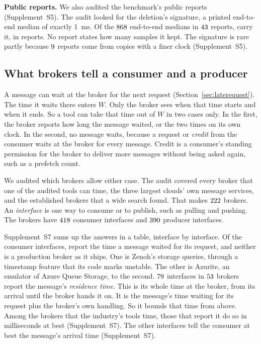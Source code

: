 \documentclass[10pt,journal,compsoc]{IEEEtran}
\begin{document}
\textbf{Public reports.}\label{sec:reports} We also audited the benchmark's public reports (Supplement~S5). The audit looked for the deletion's signature, a printed
end-to-end median of exactly 1~ms. Of the $868$ end-to-end medians in
$43$ reports, \reachPrimaryConfigsWord{} carry it, in \reachPrimaryReportsWord{}
reports. No report states how many samples it kept. The signature is rare partly because
$9$ reports come from copies with a finer clock (Supplement~S5).

\subsection{What brokers tell a consumer and a producer}
\label{sec:brokeraudit}
A message can wait at the broker for the next request (Section~\ref{sec:laterequest}). The time it
waits there enters $W$. Only the broker sees when that time starts and when it ends. So a tool
can take that time out of $W$ in two cases only. In the first, the broker reports how long the message waited,
or the two times on its own clock. In the second, no message waits, because a request or
\emph{credit} from the consumer waits at the broker for every message. Credit is a consumer's
standing permission for the broker to deliver more messages without being asked again, such as a
prefetch count.

We audited which brokers allow either case. The audit covered every broker that one of the audited tools can time, the three largest clouds' own message services, and the established brokers that a wide search found. That makes $222$ brokers. An \emph{interface} is one way to consume or to publish, such
as pulling and pushing. The brokers have
$418$ consumer interfaces and $390$ producer interfaces. 

Supplement~S7 sums up the answers in a table, interface by interface. Of the consumer interfaces, \baWaitModesWord{} report
the time a message waited for its request, and neither is a production broker as it ships. One is
Zenoh's storage queries, through a timestamp feature that its code marks unstable. The other is
Azurite, an emulator of Azure Queue Storage, to the second. $79$ interfaces in
$53$ brokers report the message's \emph{residence time}. This is its whole time at the
broker, from its arrival until the broker hands it on. It is the message's time waiting for its request
plus the broker's own handling. So it bounds that time from above. Among the brokers that the industry's tools time, those that report it do so in milliseconds at best (Supplement~S7).
The other interfaces tell the consumer at best the message's arrival time (Supplement~S7).
\end{document}
